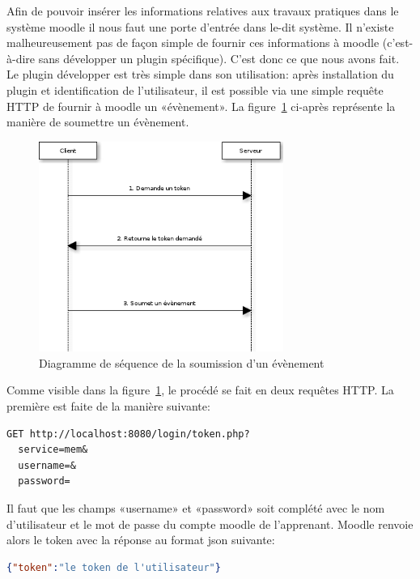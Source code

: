 \documentclass[a4paper,11pt]{report}
\begin{document}
Afin de pouvoir insérer les informations relatives aux travaux pratiques dans le système moodle il nous faut une porte d'entrée dans le-dit système. Il n'existe malheureusement pas de façon simple de fournir ces informations à moodle (c'est-à-dire sans développer un plugin spécifique).
C'est donc ce que nous avons fait. Le plugin développer est très simple dans son utilisation: après installation du plugin et identification de l'utilisateur, il est possible via une simple requête HTTP de fournir à moodle un «évènement». La figure~\ref{seq-submit-event} ci-après représente la manière de soumettre un évènement.

\begin{figure}[h]
  \begin{center}
    \caption{\label{seq-submit-event} Diagramme de séquence de la soumission d'un évènement}
    \includegraphics[width=8cm, keepaspectratio=true]{mem-seq-submit-event.png}
   \end{center}
\end{figure}

Comme visible dans la figure~\ref{seq-submit-event}, le procédé se fait en deux requêtes HTTP. La première est faite de la manière suivante:

\begin{lstlisting}[caption={Requête d'un token}]
GET http://localhost:8080/login/token.php?
  service=mem&
  username=&
  password=
\end{lstlisting}

Il faut que les champs «username» et «password» soit complété avec le nom d'utilisateur et le mot de passe du compte moodle de l'apprenant.
Moodle renvoie alors le token avec la réponse au format json suivante:

\begin{lstlisting}[language=json, caption={Retourne le token}]
{"token":"le token de l'utilisateur"}
\end{lstlisting}
\end{document}
